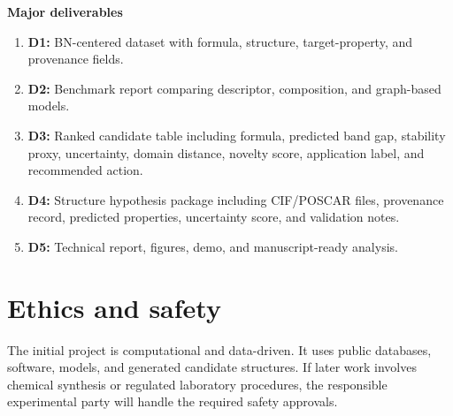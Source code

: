 \documentclass[10pt]{article}
\begin{document}
\textbf{Major deliverables}
\begin{enumerate}
  \item \textbf{D1:} BN-centered dataset with formula, structure, target-property, and provenance fields.
  \item \textbf{D2:} Benchmark report comparing descriptor, composition, and graph-based models.
  \item \textbf{D3:} Ranked candidate table including formula, predicted band gap, stability proxy, uncertainty, domain distance, novelty score, application label, and recommended action.
  \item \textbf{D4:} Structure hypothesis package including CIF/POSCAR files, provenance record, predicted properties, uncertainty score, and validation notes.
  \item \textbf{D5:} Technical report, figures, demo, and manuscript-ready analysis.
\end{enumerate}

\section*{Ethics and safety}
The initial project is computational and data-driven. It uses public databases, software, models, and generated candidate structures. If later work involves chemical synthesis or regulated laboratory procedures, the responsible experimental party will handle the required safety approvals.
\end{document}
